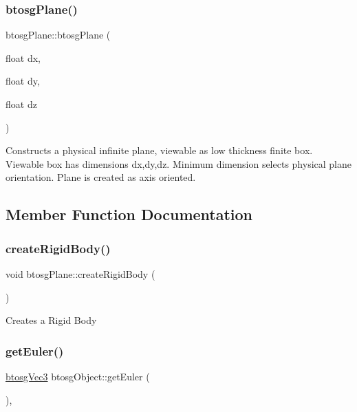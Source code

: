 \subsubsection{\texorpdfstring{btosgPlane()}{btosgPlane()}\hspace{0.1cm}{\footnotesize\ttfamily [3/3]}}
{\footnotesize\ttfamily btosg\+Plane\+::btosg\+Plane (\begin{DoxyParamCaption}\item[{float}]{dx,  }\item[{float}]{dy,  }\item[{float}]{dz }\end{DoxyParamCaption})\hspace{0.3cm}{\ttfamily [inline]}}

Constructs a physical infinite plane, viewable as low thickness finite box. Viewable box has dimensions dx,dy,dz. Minimum dimension selects physical plane orientation. Plane is created as axis oriented. 

\subsection{Member Function Documentation}
\mbox{\label{classbtosgPlane_a0e6812c186ed1fa128dccf7cd2e525a6}} 
\subsubsection{\texorpdfstring{createRigidBody()}{createRigidBody()}}
{\footnotesize\ttfamily void btosg\+Plane\+::create\+Rigid\+Body (\begin{DoxyParamCaption}{ }\end{DoxyParamCaption})\hspace{0.3cm}{\ttfamily [inline]}}

Creates a Rigid Body \mbox{\label{classbtosgObject_a2019ec63bde02b72600450c7c985e77a}} 
\subsubsection{\texorpdfstring{getEuler()}{getEuler()}}
{\footnotesize\ttfamily \mbox{\hyperlink{classbtosgVec3}{btosg\+Vec3}} btosg\+Object\+::get\+Euler (\begin{DoxyParamCaption}{ }\end{DoxyParamCaption})\hspace{0.3cm}{\ttfamily [inline]}, {\ttfamily [inherited]}}

